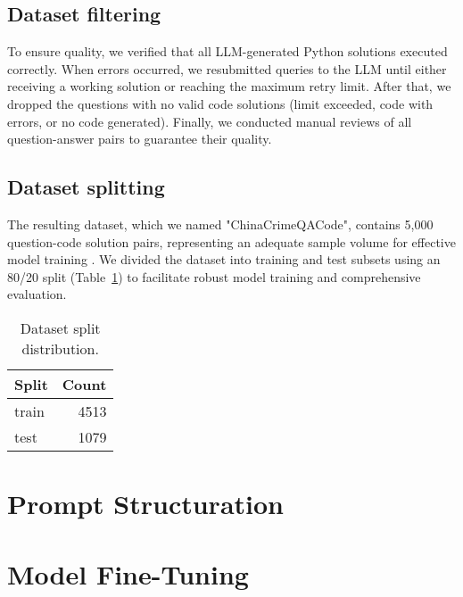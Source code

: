 \subsection{Dataset filtering}

To ensure quality, we verified that all LLM-generated Python solutions executed correctly. When errors occurred, we resubmitted queries to the LLM until either receiving a working solution or reaching the maximum retry limit. After that, we dropped the questions with no valid code solutions (limit exceeded, code with errors, or no code generated). Finally, we conducted manual reviews of all question-answer pairs to guarantee their quality.

\subsection{Dataset splitting}

The resulting dataset, which we named "ChinaCrimeQACode", contains 5,000 question-code solution pairs, representing an adequate sample volume for effective model training \citep{Unsloth2024Dataset1}. We divided the dataset into training and test subsets using an 80/20 split (Table~\ref{tab:dataset_split}) to facilitate robust model training and comprehensive evaluation.

\begin{table}[H]
\centering
\begin{tabular}{lr}
\hline
\textbf{Split} & \textbf{Count} \\
\hline
train & 4513 \\
test  & 1079 \\
\hline
\end{tabular}
\caption{Dataset split distribution.}
\label{tab:dataset_split}
\end{table}



\section{Prompt Structuration}

\section{Model Fine-Tuning}


